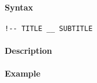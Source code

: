 


	\paragraph{Syntax}\label{syntax}

\begin{verbatim}
!-- TITLE __ SUBTITLE
\end{verbatim}

\paragraph{Description}\label{description}

\paragraph{Example}\label{example}


